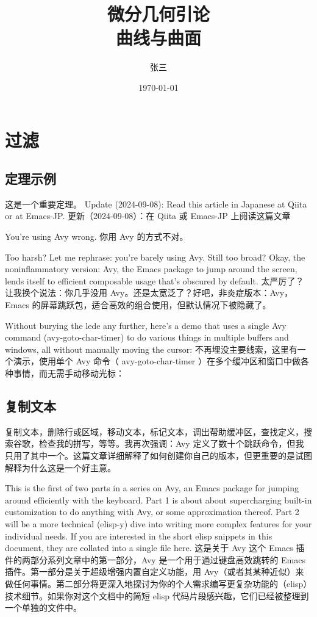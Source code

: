 \documentclass[lang=cn,color=blue]{elegantbook}
\author{张三}
\date{\today}
\title{微分几何引论\\\medskip
\large 曲线与曲面}
\begin{document}
\maketitle
\tableofcontents



\mainmatter
\chapter{过滤}
\label{sec:org298f4ce}
\section{定理示例}
\label{sec:org05b1ae2}
这是一个重要定理。
Update (2024-09-08): Read this article in Japanese at Qiita or at Emacs-JP.
更新（2024-09-08）：在 Qiita 或 Emacs-JP 上阅读这篇文章

You’re using Avy wrong.  你用 Avy 的方式不对。

Too harsh? Let me rephrase: you’re barely using Avy. Still too broad? Okay, the noninflammatory version: Avy, the Emacs package to jump around the screen, lends itself to efficient composable usage that’s obscured by default.
太严厉了？让我换个说法：你几乎没用 Avy。还是太宽泛了？好吧，非炎症版本：Avy，Emacs 的屏幕跳跃包，适合高效的组合使用，但默认情况下被隐藏了。

Without burying the lede any further, here’s a demo that uses a single Avy command (avy-goto-char-timer) to do various things in multiple buffers and windows, all without manually moving the cursor:
不再埋没主要线索，这里有一个演示，使用单个 Avy 命令（ avy-goto-char-timer ）在多个缓冲区和窗口中做各种事情，而无需手动移动光标：
\section{复制文本}
\label{sec:org6510ecc}
复制文本，删除行或区域，移动文本，标记文本，调出帮助缓冲区，查找定义，搜索谷歌，检查我的拼写，等等。我再次强调：Avy 定义了数十个跳跃命令，但我只用了其中一个。这篇文章详细解释了如何创建你自己的版本，但更重要的是试图解释为什么这是一个好主意。

This is the first of two parts in a series on Avy, an Emacs package for jumping around efficiently with the keyboard. Part 1 is about about supercharging built-in customization to do anything with Avy, or some approximation thereof. Part 2 will be a more technical (elisp-y) dive into writing more complex features for your individual needs. If you are interested in the short elisp snippets in this document, they are collated into a single file here.
这是关于 Avy 这个 Emacs 插件的两部分系列文章中的第一部分，Avy 是一个用于通过键盘高效跳转的 Emacs 插件。第一部分是关于超级增强内置自定义功能，用 Avy（或者其某种近似）来做任何事情。第二部分将更深入地探讨为你的个人需求编写更复杂功能的（elisp）技术细节。如果你对这个文档中的简短 elisp 代码片段感兴趣，它们已经被整理到一个单独的文件中。
\end{document}
